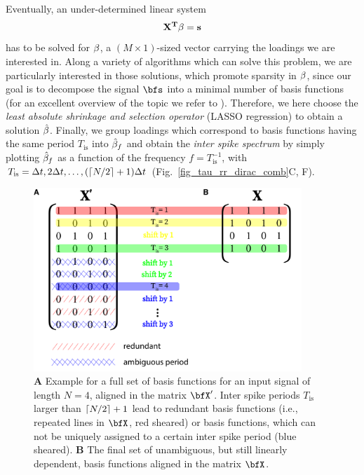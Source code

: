 \noindent Eventually, an under-determined linear system
\begin{equation}
\bf{X}^T\bf{\beta}=\bf{s}
\label{eq_linear_system}
\end{equation}  
has to be solved for $\bf{\beta}$, a $(M\times 1)$-sized vector carrying the loadings we are interested in. Along a variety of algorithms which can solve this problem, we are 
particularly interested in those solutions, which promote sparsity in $\bf{\beta}$, since our goal is to decompose the signal $\bfs$ into a minimal number of basis 
functions (for an excellent overview of the topic we refer to \citet{Brunton2019}). Therefore, we here choose the \textit{least absolute shrinkage and selection operator} 
(LASSO regression) \cite{Tibshirani1996} to obtain a solution $\hat{\bf{\beta}}$. Finally, we group loadings which correspond to basis functions having the same period 
$T_\text{is}$ into $\hat{\bf{\beta}}_f$ and obtain the 
\textit{inter spike spectrum} by simply plotting $\hat{\bf{\beta}}_f$ as a function of the frequency $f=T_\text{is}^{-1}$, with $T_\text{is}=\Delta t, 2\Delta t, \dots, (\ceil*{N/2}+1) \Delta t$ 
(Fig.~\ref{fig_tau_rr_dirac_comb}C, F).

\begin{figure}
\centering
\includegraphics[width=0.9\textwidth]{./figures/fig_tau_rr_basis_functions}
\caption{\textbf{A} Example for a full set of basis functions for an input signal of length $N=4$, aligned in the matrix $\bfX'$. Inter spike periods $T_{\text{is}}$ larger 
than $\ceil*{N/2}+1$ lead to redundant basis functions (i.e., repeated lines in $\bfX$, red sheared) or basis functions, which can not be uniquely assigned to a certain inter spike period 
(blue sheared). \textbf{B} The final set of unambiguous, but still linearly dependent, basis functions aligned in the matrix $\bfX$.} \label{fig_tau_rr_basis_functions}
\end{figure}

